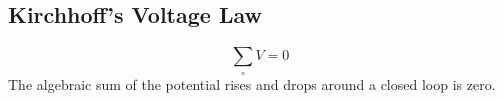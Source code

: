 
\subsection{Kirchhoff's Voltage Law} %
	\[
		\sum_\circ V = 0
	\]
	The algebraic sum of the potential rises and drops around a closed loop is zero.

